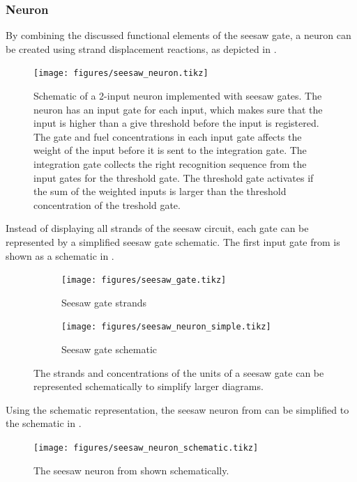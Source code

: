 \subsubsection{Neuron}
By combining the discussed functional elements of the seesaw gate, a neuron can be created using strand displacement reactions, as depicted in .


\begin{figure}[H]
\texttt{[image: figures/seesaw\_neuron.tikz]}
\caption{Schematic of a 2-input neuron implemented with seesaw gates. The neuron has an input gate for each input, which makes sure that the input is higher than a give threshold before the input is registered. The gate and fuel concentrations in each input gate affects the weight of the input before it is sent to the integration gate. The integration gate collects the right recognition sequence from the input gates for the threshold gate. The threshold gate activates if the sum of the weighted inputs is larger than the threshold concentration of the treshold gate.}
\label{seesaw_neuron}
\end{figure}

Instead of displaying all strands of the seesaw circuit, each gate can be represented by a simplified seesaw gate schematic. The first input gate from  is shown as a schematic in .

\begin{figure}[H]
  \begin{subfigure}[t]{.49\textwidth}
    \texttt{[image: figures/seesaw\_gate.tikz]}
    \caption{Seesaw gate strands}
  \end{subfigure}
  \quad
  \begin{subfigure}[t]{.49\textwidth}
    \texttt{[image: figures/seesaw\_neuron\_simple.tikz]}
    \caption{Seesaw gate schematic}
  \end{subfigure}
  \caption{The strands and concentrations of the units of a seesaw gate can be represented schematically to simplify larger diagrams.}
  \label{seesaw_gate_simple}
\end{figure}

Using the schematic representation, the seesaw neuron from  can be simplified to the schematic in .

\begin{figure}[H]
  \texttt{[image: figures/seesaw\_neuron\_schematic.tikz]}
  \caption{The seesaw neuron from  shown schematically.}
  \label{seesaw_neuron_schematic}
\end{figure}

